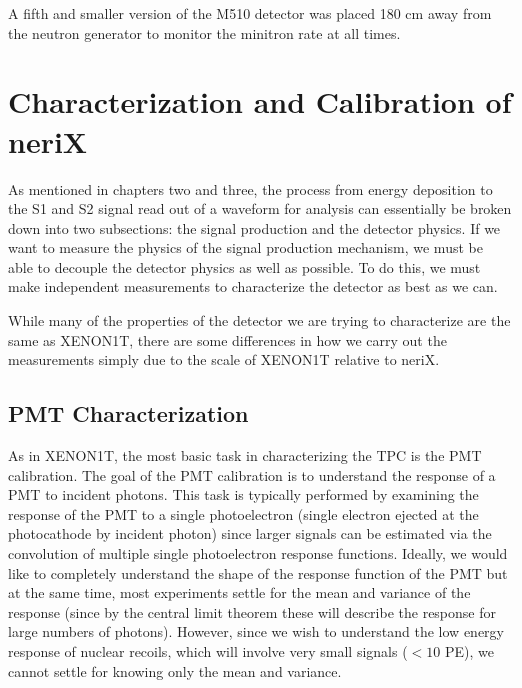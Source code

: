 A fifth and smaller version of the M510 detector was placed 180 cm away from the neutron generator to monitor the minitron rate at all times.


\section{Characterization and Calibration of neriX}

As mentioned in chapters two and three, the process from energy deposition to the S1 and S2 signal read out of a waveform for analysis can essentially be broken down into two subsections: the signal production and the detector physics.  If we want to measure the physics of the signal production mechanism, we must be able to decouple the detector physics as well as possible.  To do this, we must make independent measurements to characterize the detector as best as we can.  

While many of the properties of the detector we are trying to characterize are the same as XENON1T, there are some differences in how we carry out the measurements simply due to the scale of XENON1T relative to neriX.



\subsection{PMT Characterization}

As in XENON1T, the most basic task in characterizing the TPC is the PMT calibration.  The goal of the PMT calibration is to understand the response of a PMT to incident photons.  This task is typically performed by examining the response of the PMT to a single photoelectron (single electron ejected at the photocathode by incident photon) since larger signals can be estimated via the convolution of multiple single photoelectron response functions.  Ideally, we would like to completely understand the shape of the response function of the PMT but at the same time, most experiments settle for the mean and variance of the response (since by the central limit theorem these will describe the response for large numbers of photons).  However, since we wish to understand the low energy response of nuclear recoils, which will involve very small signals ($< 10$ PE), we cannot settle for knowing only the mean and variance.

